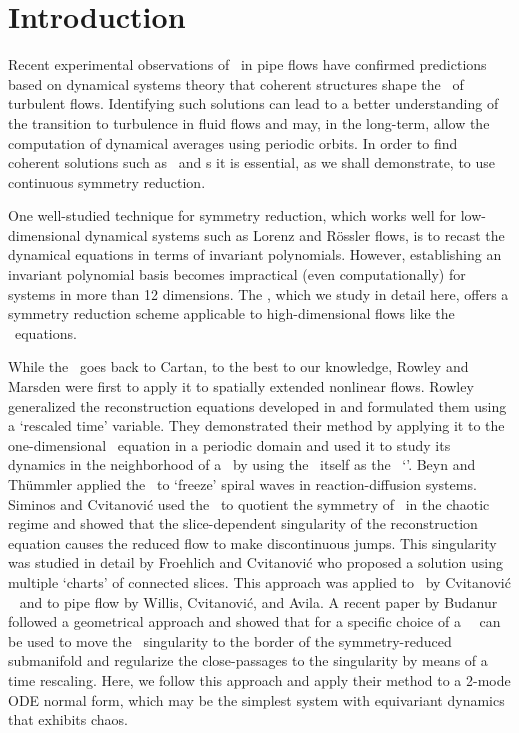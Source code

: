 \section{Introduction}
\label{s:intro}

Recent experimental observations of \reqva\ in pipe flows have confirmed
predictions based on dynamical systems theory that coherent structures shape 
the \statesp\ of turbulent flows. Identifying such solutions can lead to a better
understanding of the transition to turbulence in fluid flows and may, in the long-term,
allow the computation of dynamical averages using periodic orbits. In order to
find coherent solutions such as \reqva\ and \rpo s it is essential, as we shall demonstrate, 
to use continuous symmetry reduction.

One well-studied technique for symmetry reduction, which works well for low-dimensional dynamical systems such 
as Lorenz and R\"{o}ssler flows, is to recast the dynamical equations in terms of invariant polynomials. 
However, establishing an invariant polynomial basis becomes impractical (even computationally) for systems in more than 12 dimensions.
The \mslices%
,
which we study in detail here, offers a symmetry reduction
scheme applicable to high-dimensional flows like the \NS\ equations.

While the \mslices\ goes back to Cartan, to the
best to our knowledge, Rowley and Marsden
were first to apply it to spatially extended nonlinear flows. Rowley
\etal~ generalized the reconstruction equations
developed in  and formulated them using a `rescaled
time' variable. They demonstrated their method by applying it to the one-dimensional \KS\ equation
in a periodic domain and used it to study its dynamics in the neighborhood of a \reqv\ by using the \reqv\ itself as the \slice\ `\template'.  Beyn and
Th\"{u}mmler applied the \mslices\ to `freeze' spiral
waves in reaction-diffusion systems.
Siminos and Cvitanovi\'{c} used the \mslices\ to quotient the  symmetry of
\cLf\ in the chaotic regime and showed that the slice-dependent
singularity of the reconstruction equation causes the reduced flow to make
discontinuous jumps. This singularity was studied in detail by 
Froehlich and Cvitanovi\'{c} who proposed a solution using multiple `charts' of connected
slices. This approach was applied to \cLf\
by Cvitanovi\'{c} \etal~ and to pipe flow by Willis, Cvitanovi\'{c}, and Avila. A
recent paper by Budanur \etal\rf{BudCvi14} followed a geometrical approach
and showed that for \SOn{2} a specific choice of a \slice\
\template\ can be used to move the \slice\ singularity to the border of the
symmetry-reduced submanifold and regularize the close-passages to the
singularity by means of a time rescaling. Here, we follow this approach
and apply their method to a 2-mode ODE normal form, which may be
the simplest system with \SOn{2} equivariant dynamics
that exhibits chaos.

